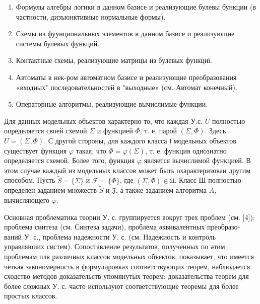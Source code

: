 \documentclass[10pt]{article}
\begin{document}
\begin{enumerate}

  \item Формулы алгебры логики в данном базисе и реализующие булевы бункции (в частности, дизъюнктивные нормальные формы).



  \item Схемы из фуунциональных элементов в данном базисе и реализующие системы булевых функций.



  \item Контактные схемы, реализующие матрицы из булевых функциї.



  \item Автоматы в нек-ром автоматном базисе и реализующие преобразования «входных" последовательностей в "выходные» (см. Автомат конечный).



  \item Операторные алгоритмы, реализующие вычислимые функции.



\end{enumerate}



Для данных модельных объектов характерно то, что каждая У.с. $U$ полностью определяется своей схемой $\Sigma$ и функцией $\Phi$, т. е. парой $(\Sigma, \Phi)$. Здесь $U=(\Sigma, \Phi)$. С другой стороны, для каждого класса $\mathfrak{l}$ модельных объектов существует функция $\varphi$ такая, что $\Phi=\varphi(\Sigma)$, т. е. функция однознатно определяется схемой. Более того, функция $\varphi$ является вычислимой функцией. В этом случае каждый из модельных классов может быть охарактеризован другим способом. Пусть $\widetilde{S}=\{\Sigma\}$ и $\mathscr{F}=\{\Phi\}$, где $(\Sigma, \Phi) \in \mathfrak{U}$. Класс Ш полностью определен заданием множеств $\widetilde{S}$ и $\mathfrak{J}$, а также заданием алгоритма $A$, вычисляющего $\varphi$.



Основная проблематика теории У. с. группируется вокруг трех проблем (см. [4]): проблема синтеза (см. Синтеза задачи), проблема әквивалентных преобразо- ваний У. с., проблема надежности У. с. (см. Надежиость и контроль управляюиих систем). Сопоставление результатов, полученных по әтим проблемам пля различных классов модельных объектов, показывает, что имеется четкая закономерность в формулировках соответствующих теорем, наблюдается сходство методов доказательств упомянутых теорем; доказательства теорем для более сложных У. с. часто используют соответствующие теоремы для более простых классов.
\end{document}
